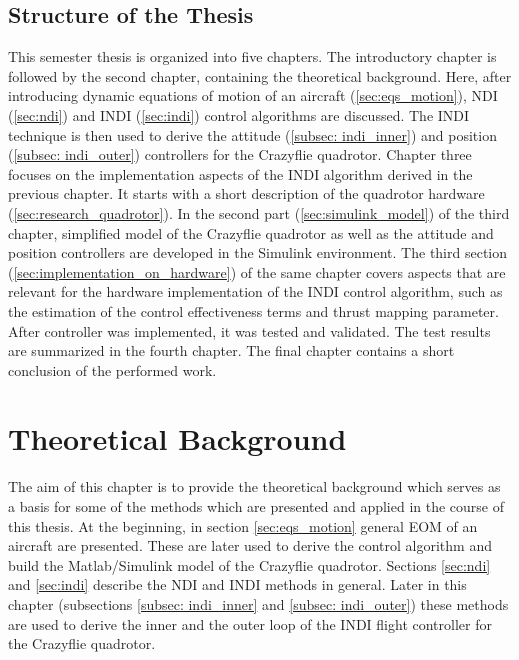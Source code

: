 \documentclass[11pt, a4paper, twoside]{report}
\begin{document}
\section{Structure of the Thesis} \label{sec:structure_ofthe_thesis} 

This semester thesis is organized into five chapters. The introductory chapter is followed by the second chapter, containing the theoretical background. Here, after introducing dynamic equations of motion of an aircraft (\ref{sec:eqs_motion}), \acrshort{NDI} (\ref{sec:ndi}) and \acrshort{INDI} (\ref{sec:indi}) control algorithms are discussed. The \acrshort{INDI} technique is then used to derive the attitude (\ref{subsec: indi_inner}) and position (\ref{subsec: indi_outer}) controllers for the Crazyflie quadrotor. Chapter three focuses on the implementation aspects of the \acrshort{INDI} algorithm derived in the previous chapter. It starts with a short description of the quadrotor hardware (\ref{sec:research_quadrotor}). In the second part (\ref{sec:simulink_model}) of the third chapter, simplified model of the Crazyflie quadrotor as well as the attitude and position controllers are developed in the Simulink environment. The third section (\ref{sec:implementation_on_hardware}) of the same chapter covers aspects that are relevant for the hardware implementation of the \acrshort{INDI} control algorithm, such as the estimation of the control effectiveness terms and thrust mapping parameter. After controller was implemented, it was tested and validated. The test results are summarized in the fourth chapter. The final chapter contains a short conclusion of the performed work.


\chapter{Theoretical Background} \label{cha:theoretical_background}

The aim of this chapter is to provide the theoretical background which serves as a basis for some of the methods which are presented and applied in the course of this thesis. At the beginning, in section \ref{sec:eqs_motion} general \acrfull{EOM} of an aircraft are presented. These are later used to derive the control algorithm and build the Matlab/Simulink model of the Crazyflie quadrotor. Sections \ref{sec:ndi} and \ref{sec:indi} describe the \acrfull{NDI} and \acrfull{INDI} methods in general. Later in this chapter (subsections \ref{subsec: indi_inner} and \ref{subsec: indi_outer}) these methods are used to derive the inner and the outer loop of the \acrshort{INDI} flight controller for the Crazyflie quadrotor.
\end{document}
